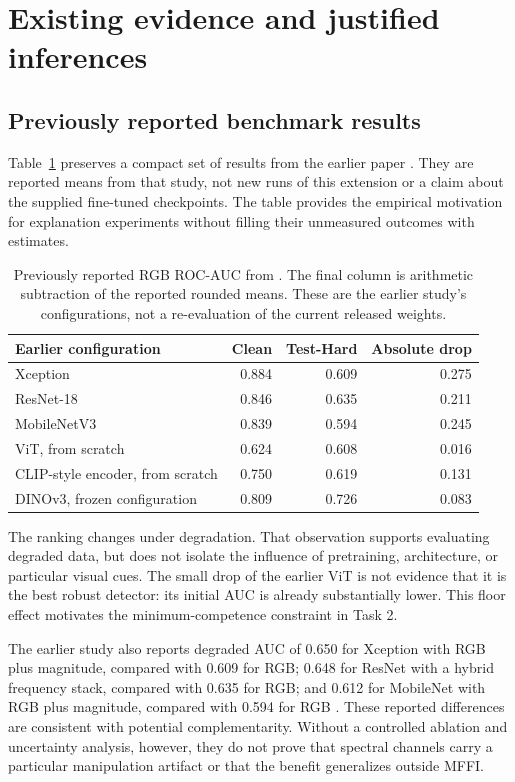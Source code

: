 \documentclass{article}
\begin{document}
\section{Existing evidence and justified inferences}
\subsection{Previously reported benchmark results}
Table~\ref{tab:legacy} preserves a compact set of results from the earlier paper \citep{cunha2026}. They are reported means from that study, not new runs of this extension or a claim about the supplied fine-tuned checkpoints. The table provides the empirical motivation for explanation experiments without filling their unmeasured outcomes with estimates.

\begin{table}[t]
\caption{Previously reported RGB ROC-AUC from \citet{cunha2026}. The final column is arithmetic subtraction of the reported rounded means. These are the earlier study's configurations, not a re-evaluation of the current released weights.}
\label{tab:legacy}
\centering
\begin{tabular}{lrrr}
\toprule
Earlier configuration & Clean & Test-Hard & Absolute drop\\
\midrule
Xception & 0.884 & 0.609 & 0.275\\
ResNet-18 & 0.846 & 0.635 & 0.211\\
MobileNetV3 & 0.839 & 0.594 & 0.245\\
ViT, from scratch & 0.624 & 0.608 & 0.016\\
CLIP-style encoder, from scratch & 0.750 & 0.619 & 0.131\\
DINOv3, frozen configuration & 0.809 & 0.726 & 0.083\\
\bottomrule
\end{tabular}
\end{table}

The ranking changes under degradation. That observation supports evaluating degraded data, but does not isolate the influence of pretraining, architecture, or particular visual cues. The small drop of the earlier ViT is not evidence that it is the best robust detector: its initial AUC is already substantially lower. This floor effect motivates the minimum-competence constraint in Task 2.

The earlier study also reports degraded AUC of 0.650 for Xception with RGB plus magnitude, compared with 0.609 for RGB; 0.648 for ResNet with a hybrid frequency stack, compared with 0.635 for RGB; and 0.612 for MobileNet with RGB plus magnitude, compared with 0.594 for RGB \citep{cunha2026}. These reported differences are consistent with potential complementarity. Without a controlled ablation and uncertainty analysis, however, they do not prove that spectral channels carry a particular manipulation artifact or that the benefit generalizes outside MFFI.
\end{document}
